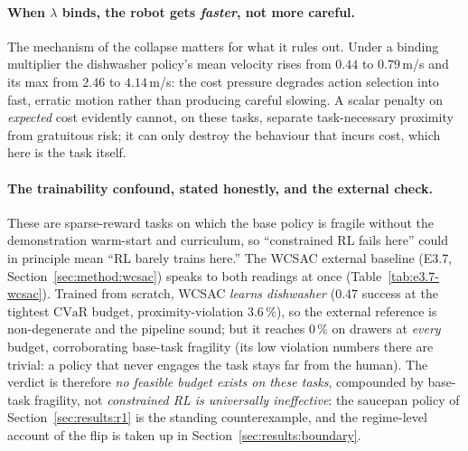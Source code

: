 \documentclass[11pt,a4paper]{report}
\newcommand{\cvar}{\ensuremath{\mathrm{CVaR}}}
\begin{document}
\paragraph{When $\lambda$ binds, the robot gets \emph{faster}, not more careful.}
The mechanism of the collapse matters for what it rules out. Under a
binding multiplier the dishwasher policy's mean velocity rises from
$0.44$ to $0.79$\,m/s and its max from $2.46$ to $4.14$\,m/s: the
cost pressure degrades action selection into fast, erratic motion
rather than producing careful slowing. A scalar penalty on
\emph{expected} cost evidently cannot, on these tasks, separate
task-necessary proximity from gratuitous risk; it can only destroy
the behaviour that incurs cost, which here is the task itself.

\paragraph{The trainability confound, stated honestly, and the external check.}
\label{sec:results:wcsac}
These are sparse-reward tasks on which the base policy is fragile
without the demonstration warm-start and curriculum, so ``constrained
RL fails here'' could in principle mean ``RL barely trains here.''
The WCSAC external baseline (E3.7, Section~\ref{sec:method:wcsac})
speaks to both readings at once (Table~\ref{tab:e3.7-wcsac}).
Trained from scratch, WCSAC \emph{learns dishwasher} ($0.47$ success
at the tightest \cvar{} budget, proximity-violation $3.6\,\%$), so
the external reference is non-degenerate and the pipeline sound; but
it reaches $0\,\%$ on drawers at \emph{every} budget, corroborating
base-task fragility (its low violation numbers there are trivial: a
policy that never engages the task stays far from the human). The
verdict is therefore \emph{no feasible budget exists on these
tasks}, compounded by base-task fragility, not \emph{constrained RL
is universally ineffective}: the saucepan policy of
Section~\ref{sec:results:r1} is the
standing counterexample, and the regime-level account of the flip is
taken up in Section~\ref{sec:results:boundary}.
\end{document}
